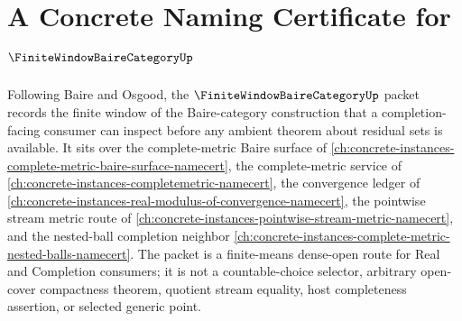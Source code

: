 \chapter{A Concrete Naming Certificate for $\FiniteWindowBaireCategoryUp$}
\label{ch:concrete-instances-finite-window-baire-category-namecert}

Following Baire and Osgood, the $\FiniteWindowBaireCategoryUp$ packet records the finite window of the Baire-category construction that a completion-facing consumer can inspect before any ambient theorem about residual sets is available. It sits over the complete-metric Baire surface of \autoref{ch:concrete-instances-complete-metric-baire-surface-namecert}, the complete-metric service of \autoref{ch:concrete-instances-completemetric-namecert}, the convergence ledger of \autoref{ch:concrete-instances-real-modulus-of-convergence-namecert}, the pointwise stream metric route of \autoref{ch:concrete-instances-pointwise-stream-metric-namecert}, and the nested-ball completion neighbor \autoref{ch:concrete-instances-complete-metric-nested-balls-namecert}. The packet is a finite-means dense-open route for Real and Completion consumers; it is not a countable-choice selector, arbitrary open-cover compactness theorem, quotient stream equality, host completeness assertion, or selected generic point.

